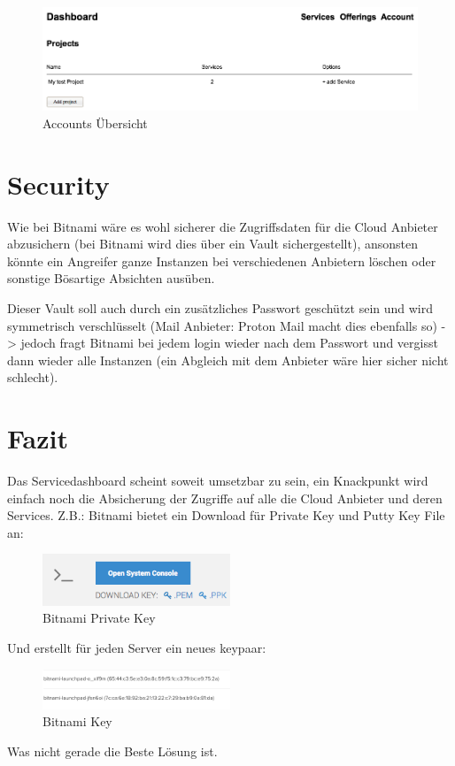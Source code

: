 \begin{figure}[!htbp]
\includegraphics[width=\textwidth]{./03_Analyse/03_Dashboard/images/account_projects.png}
\caption{Accounts Übersicht}
\end{figure}

\section{Security}
Wie bei Bitnami wäre es wohl sicherer die Zugriffsdaten für die Cloud Anbieter 
abzusichern (bei Bitnami wird dies über ein Vault sichergestellt), ansonsten 
könnte ein Angreifer ganze Instanzen bei verschiedenen Anbietern löschen oder 
sonstige Bösartige Absichten ausüben.

Dieser Vault soll auch durch ein zusätzliches Passwort geschützt sein und 
wird symmetrisch verschlüsselt (Mail Anbieter: Proton Mail\autocite{proton} macht dies ebenfalls 
so) -> jedoch fragt Bitnami bei jedem login wieder nach dem Passwort und 
vergisst dann wieder alle Instanzen (ein Abgleich mit dem Anbieter wäre hier sicher nicht 
schlecht).

\newpage

\section{Fazit}
Das Servicedashboard scheint soweit umsetzbar zu sein, ein Knackpunkt wird 
einfach noch die Absicherung der Zugriffe auf alle die Cloud Anbieter und deren 
Services.
Z.B.: Bitnami bietet ein Download für Private Key und Putty Key File an:
\begin{figure}[!htbp]
\includegraphics[width=0.5\textwidth]{./03_Analyse/03_Dashboard/images/bitnami_private_key}
\caption{Bitnami Private Key}
\end{figure}
Und erstellt für jeden Server ein neues keypaar:
\begin{figure}[!htbp]
\includegraphics[width=0.5\textwidth]{./03_Analyse/03_Dashboard/images/bitnami_key}
\caption{Bitnami Key}
\end{figure}
Was nicht gerade die Beste Lösung ist.

